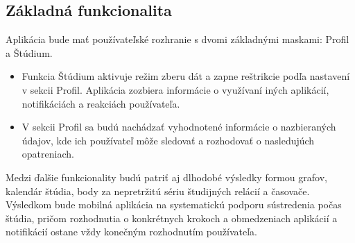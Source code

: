 \documentclass[11pt,a4paper,slovak]{article}
\begin{document}
\subsection*{Základná funkcionalita}
Aplikácia bude mať používateľské rozhranie s dvomi základnými maskami: Profil a Štúdium.
\begin{itemize}
\item Funkcia Štúdium aktivuje režim zberu dát a zapne reštrikcie podľa nastavení v sekcii Profil. 
Aplikácia zozbiera informácie o využívaní iných aplikácií, notifikáciách a reakciách používateľa. 
\item V sekcii Profil sa budú nachádzať vyhodnotené informácie o nazbieraných údajov, kde ich používateľ môže sledovať a rozhodovať o nasledujúch opatreniach. 
\end{itemize}
Medzi ďalšie funkcionality budú patriť aj dlhodobé výsledky formou grafov, kalendár štúdia, body za nepretržitú sériu študijných relácií a časovače.\\
Výsledkom bude mobilná aplikácia na systematickú podporu sústredenia počas štúdia, pričom rozhodnutia o konkrétnych krokoch a obmedzeniach aplikácií a notifikácií ostane vždy konečným rozhodnutím používateľa.   
\end{document}
